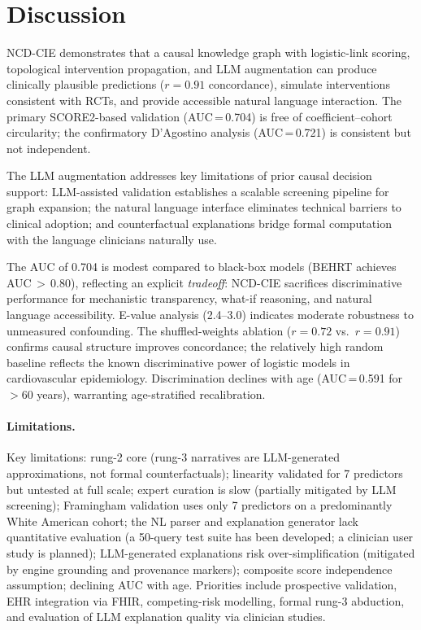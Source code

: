 \documentclass[runningheads]{llncs}
\begin{document}
\section{Discussion}\label{sec:discussion}

NCD-CIE demonstrates that a causal knowledge graph with logistic-link
scoring, topological intervention propagation, and LLM augmentation
can produce clinically plausible predictions ($r = 0.91$ concordance),
simulate interventions consistent with RCTs, and provide accessible
natural language interaction.
The primary SCORE2-based validation (AUC\,=\,0.704) is free of
coefficient--cohort circularity; the confirmatory D'Agostino analysis
(AUC\,=\,0.721) is consistent but not independent.

The LLM augmentation addresses key limitations of prior causal
decision support: LLM-assisted validation establishes a scalable
screening pipeline for graph expansion; the natural language
interface eliminates technical barriers to clinical adoption; and
counterfactual explanations bridge formal computation with the
language clinicians naturally use.

The AUC of 0.704 is modest compared to black-box models
(BEHRT achieves AUC\,$>$\,0.80), reflecting an explicit
\emph{tradeoff}: NCD-CIE sacrifices discriminative performance for
mechanistic transparency, what-if reasoning, and natural language
accessibility.
E-value analysis (2.4--3.0) indicates moderate robustness to
unmeasured confounding.
The shuffled-weights ablation ($r = 0.72$ vs.\ $r = 0.91$)
confirms causal structure improves concordance; the relatively
high random baseline reflects the known discriminative power of
logistic models in cardiovascular epidemiology.
Discrimination declines with age (AUC\,=\,0.591 for $>$60 years),
warranting age-stratified recalibration.

\paragraph{Limitations.}
Key limitations: rung-2 core (rung-3 narratives are LLM-generated
approximations, not formal counterfactuals); linearity
validated for 7 predictors but untested at full scale; expert
curation is slow (partially mitigated by LLM screening);
Framingham validation uses only 7 predictors on a predominantly
White American cohort; the NL parser and explanation generator lack quantitative
evaluation (a 50-query test suite has been developed; a clinician
user study is planned);
LLM-generated explanations risk over-simplification
(mitigated by engine grounding and provenance markers); composite score independence
assumption; declining AUC with age.
Priorities include prospective validation, EHR integration via
FHIR, competing-risk modelling, formal rung-3 abduction, and
evaluation of LLM explanation quality via clinician studies.
\end{document}
